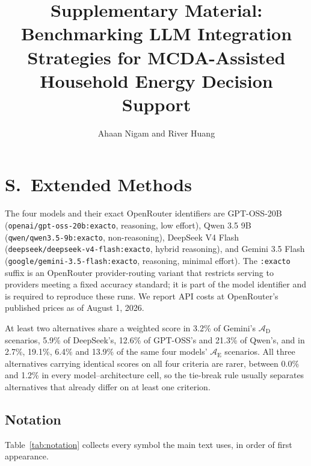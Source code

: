 \documentclass[11pt]{article}
\title{Supplementary Material: Benchmarking LLM Integration Strategies for MCDA-Assisted Household Energy Decision Support}
\author{Ahaan Nigam and River Huang}
\date{}
\newcounter{suppsectioncounter}
\newcommand{\suppsection}[1]{%
  \stepcounter{suppsectioncounter}%
  \section*{S\thesuppsectioncounter.\ #1}%
  \setcounter{table}{0}\setcounter{figure}{0}\setcounter{equation}{0}%
  \setcounter{section}{\value{suppsectioncounter}}\setcounter{subsection}{0}%
  \renewcommand{\theHtable}{S\thesuppsectioncounter.\arabic{table}}%
  \renewcommand{\theHfigure}{S\thesuppsectioncounter.\arabic{figure}}%
}
\begin{document}
\maketitle
\suppsection{Extended Methods}
\label{app:model_routing}

The four models and their exact OpenRouter identifiers are GPT-OSS-20B (\nolinkurl{openai/gpt-oss-20b:exacto}, reasoning, low effort), Qwen 3.5 9B (\nolinkurl{qwen/qwen3.5-9b:exacto}, non-reasoning), DeepSeek V4 Flash (\nolinkurl{deepseek/deepseek-v4-flash:exacto}, hybrid reasoning), and Gemini 3.5 Flash (\nolinkurl{google/gemini-3.5-flash:exacto}, reasoning, minimal effort). The \texttt{:exacto} suffix is an OpenRouter provider-routing variant that restricts serving to providers meeting a fixed accuracy standard; it is part of the model identifier and is required to reproduce these runs. We report API costs at OpenRouter's published prices as of August 1, 2026.

At least two alternatives share a weighted score in 3.2\% of Gemini's $\mathcal{A}_{\text{D}}$ scenarios, 5.9\% of DeepSeek's, 12.6\% of GPT-OSS's and 21.3\% of Qwen's, and in 2.7\%, 19.1\%, 6.4\% and 13.9\% of the same four models' $\mathcal{A}_{\text{E}}$ scenarios. All three alternatives carrying identical scores on all four criteria are rarer, between 0.0\% and 1.2\% in every model--architecture cell, so the tie-break rule usually separates alternatives that already differ on at least one criterion.
\subsection{Notation}
\label{app:notation}

Table~\ref{tab:notation} collects every symbol the main text uses, in order of first appearance.
\end{document}
